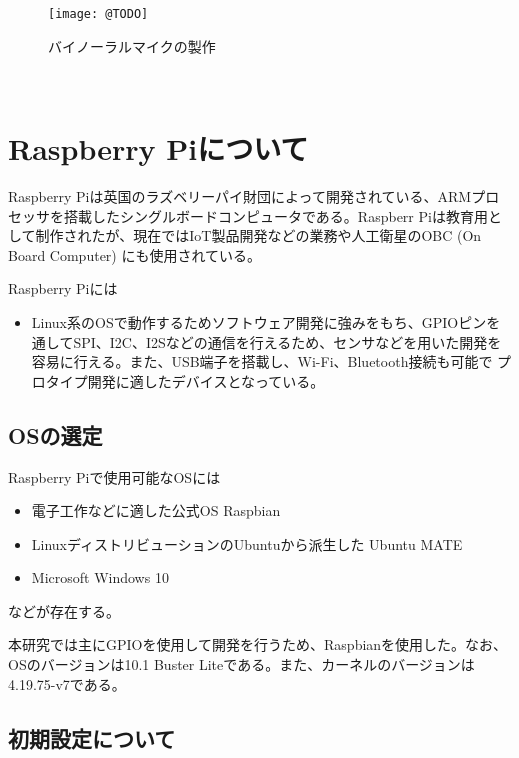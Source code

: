 \begin{figure}
\centering
\texttt{[image: @TODO]}
\caption{バイノーラルマイクの製作}
\end{figure}

\
\section{Raspberry
Piについて}\label{about-raspberry}

Raspberry
Piは英国のラズベリーパイ財団によって開発されている、ARMプロセッサを搭載したシングルボードコンピュータである。Raspberr
Piは教育用として制作されたが、現在ではIoT製品開発などの業務や人工衛星のOBC
(On Board Computer) にも使用されている。

Raspberry Piには

\begin{itemize}
\tightlist
\item
  Linux系のOSで動作するためソフトウェア開発に強みをもち、GPIOピンを通してSPI、I2C、I2Sなどの通信を行えるため、センサなどを用いた開発を容易に行える。また、USB端子を搭載し、Wi-Fi、Bluetooth接続も可能で
  プロタイプ開発に適したデバイスとなっている。
\end{itemize}

\subsection{OSの選定}\label{choose-os}

Raspberry Piで使用可能なOSには

\begin{itemize}
\tightlist
\item
  電子工作などに適した公式OS Raspbian
\item
  LinuxディストリビューションのUbuntuから派生した Ubuntu MATE
\item
  Microsoft Windows 10
\end{itemize}

などが存在する。

本研究では主にGPIOを使用して開発を行うため、Raspbianを使用した。なお、OSのバージョンは10.1
Buster Liteである。また、カーネルのバージョンは4.19.75-v7である。

\subsection{初期設定について}\label{about-setup}

